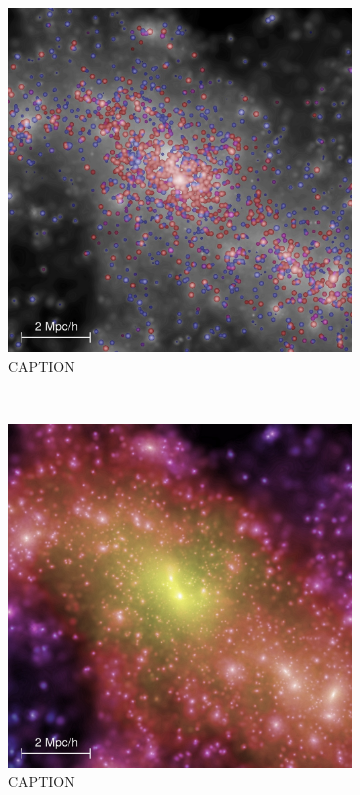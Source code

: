 \documentclass[%
 reprint,
 amsmath,amssymb,
 aps,nofootinbib
]{revtex4-1}
\begin{document}
\begin{figure}
    \centering
    \begin{subfigure}[H]{0.375\textwidth}
        \includegraphics[width=\textwidth]{figs-swe/thesis/ms_galaxies.jpg}
        \captionsetup{justification=raggedright,singlelinecheck=false}
        \caption{CAPTION}
        \label{ms_galaxies}
    \end{subfigure}
    ~
    \begin{subfigure}[H]{0.375\textwidth}
        \includegraphics[width=\textwidth]{figs-swe/thesis/ms_halos.jpg}
        \captionsetup{justification=raggedright,singlelinecheck=false}
        \caption{CAPTION}
        \label{ms_halos}
    \end{subfigure}
    \caption{}
    \label{ms_compare}
\end{figure}
\end{document}
